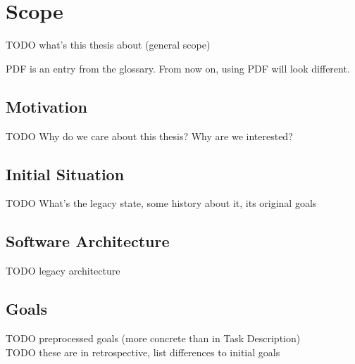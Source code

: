 \chapter{Scope}
TODO what's this thesis about (general scope)

\gls{PDF} is an entry from the glossary. From now on, using \gls{PDF} will look
different.

\section{Motivation}
TODO Why do we care about this thesis? Why are we interested?\\

\section{Initial Situation}
TODO What's the legacy state, some history about it, its original goals

\section{Software Architecture}
TODO legacy architecture\\


\section{Goals}
TODO preprocessed goals (more concrete than in Task Description)\\
TODO these are in retrospective, list differences to initial goals\\

